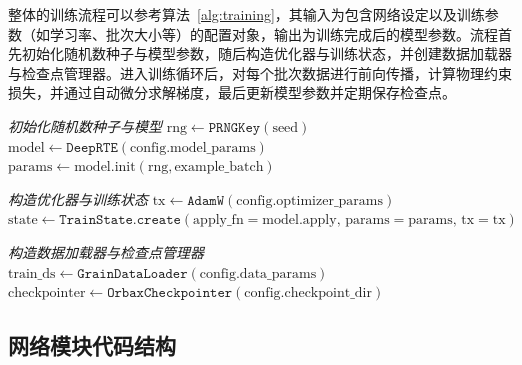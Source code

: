 整体的训练流程可以参考算法~\ref{alg:training}，其输入为包含网络设定以及训练参数（如学习率、批次大小等）的配置对象，输出为训练完成后的模型参数。流程首先初始化随机数种子与模型参数，随后构造优化器与训练状态，并创建数据加载器与检查点管理器。进入训练循环后，对每个批次数据进行前向传播，计算物理约束损失，并通过自动微分求解梯度，最后更新模型参数并定期保存检查点。

\begin{algorithm}[htbp]
    \caption{DeepRTE完整训练流程}
    \label{alg:training}
    \SetAlgoLined

    \BlankLine

    \emph{初始化随机数种子与模型}\;
    $\text{rng} \gets \texttt{PRNGKey}(\text{seed})$\;
    $\text{model} \gets \texttt{DeepRTE}(\text{config.model\_params})$\;
    $\text{params} \gets \text{model.init}(\text{rng}, \text{example\_batch})$\;

    \emph{构造优化器与训练状态}\;
    $\text{tx} \gets \texttt{AdamW}(\text{config.optimizer\_params})$\;
    $\text{state} \gets \texttt{TrainState.create}(\text{apply\_fn}=\text{model.apply},\, \text{params}=\text{params},\, \text{tx}=\text{tx})$\;

    \emph{构造数据加载器与检查点管理器}\;
    $\text{train\_ds} \gets \texttt{GrainDataLoader}(\text{config.data\_params})$\;
    $\text{checkpointer} \gets \texttt{OrbaxCheckpointer}(\text{config.checkpoint\_dir})$\;


    \;
\end{algorithm}

\subsection{网络模块代码结构}

